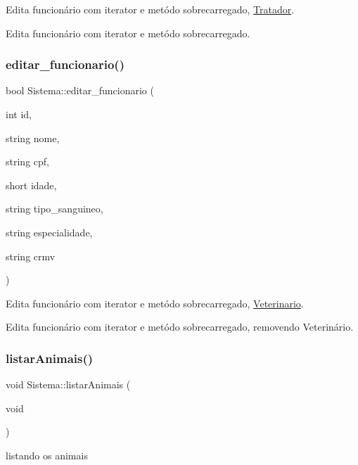 Edita funcionário com iterator e metódo sobrecarregado, \mbox{\hyperlink{class_tratador}{Tratador}}. 

Edita funcionário com iterator e metódo sobrecarregado. \mbox{\label{class_sistema_acbbe56ff28b53805edb16ec4a7cf0dd0}} 
\subsubsection{\texorpdfstring{editar\_funcionario()}{editar\_funcionario()}\hspace{0.1cm}{\footnotesize\ttfamily [2/2]}}
{\footnotesize\ttfamily bool Sistema\+::editar\+\_\+funcionario (\begin{DoxyParamCaption}\item[{int}]{id,  }\item[{string}]{nome,  }\item[{string}]{cpf,  }\item[{short}]{idade,  }\item[{string}]{tipo\+\_\+sanguineo,  }\item[{string}]{especialidade,  }\item[{string}]{crmv }\end{DoxyParamCaption})}



Edita funcionário com iterator e metódo sobrecarregado, \mbox{\hyperlink{class_veterinario}{Veterinario}}. 

Edita funcionário com iterator e metódo sobrecarregado, removendo Veterinário. \mbox{\label{class_sistema_a1296c9bb67a554963f550b5a4d1dec40}} 
\subsubsection{\texorpdfstring{listarAnimais()}{listarAnimais()}}
{\footnotesize\ttfamily void Sistema\+::listar\+Animais (\begin{DoxyParamCaption}\item[{void}]{ }\end{DoxyParamCaption})}



listando os animais 

